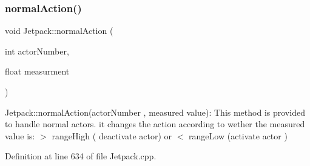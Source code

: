 \subsubsection{\texorpdfstring{normal\+Action()}{normalAction()}}
{\footnotesize\ttfamily void Jetpack\+::normal\+Action (\begin{DoxyParamCaption}\item[{int}]{actor\+Number,  }\item[{float}]{measurment }\end{DoxyParamCaption})}

Jetpack\+::normal\+Action(actor\+Number , measured value)\+: This method is provided to handle normal actors. it changes the action according to wether the measured value is\+: $>$ range\+High ( deactivate actor) or $<$ range\+Low (activate actor ) 

Definition at line 634 of file Jetpack.\+cpp.


